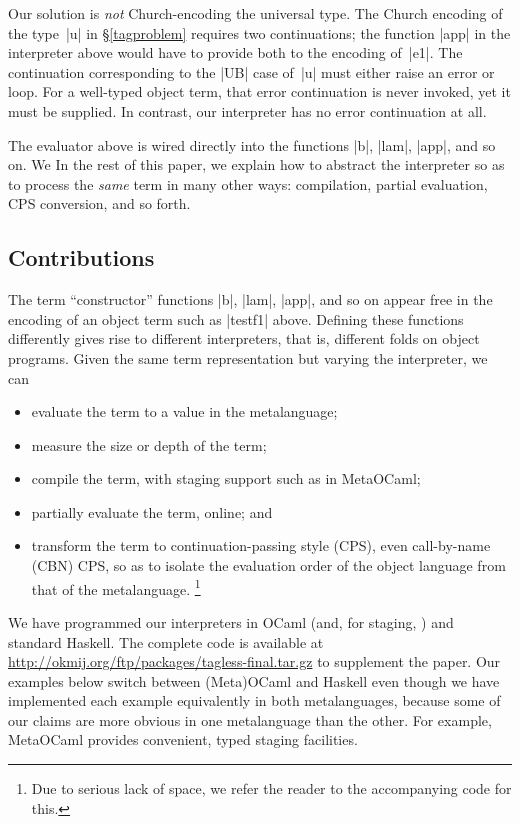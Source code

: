 Our solution is \emph{not} Church-encoding the
universal type. The Church encoding of the type~|u| in \S\ref{tagproblem}
requires two continuations; the function |app| in the interpreter above would
have to provide both to the encoding of~|e1|. The continuation
corresponding to the |UB| case of~|u| must either raise an error or
loop. For a well-typed object term, that error continuation is never
invoked, yet it must be supplied. In contrast, our interpreter has no error
continuation at all.

The evaluator above is wired directly into the
functions |b|, |lam|, |app|, and so on.  \ifshort We \else In the rest of this paper, we \fi
explain how to abstract the interpreter so as
to process the \emph{same} term in many other
ways: compilation, partial evaluation, CPS
conversion, and so forth.

\subsection{Contributions}\label{contributions}

The term ``constructor'' functions |b|, |lam|, |app|, and so on appear
free in the encoding of an object term such as |testf1| above.  Defining
these functions differently gives rise to different interpreters, that
is, different folds on object programs.  Given the same term
representation but varying the interpreter, we can
\begin{itemize}
    \item evaluate the term to a value in the metalanguage;
    \item measure the size or depth of the term;
    \item compile the term, with staging support such as in MetaOCaml;
    \item partially evaluate the term, online; and
    \item transform the term to continuation\hyp passing style (CPS),
        even call-by-name (CBN) CPS, so as to isolate the evaluation
        order of the object language from that of the metalanguage.\ifshort
\footnote{Due to serious lack of space, 
we refer the reader to the accompanying code for this.}\fi
\end{itemize}
We have programmed our interpreters in OCaml (and, for staging,
\citet{metaocaml}) and standard Haskell. The complete code is
available at \url{http://okmij.org/ftp/packages/tagless-final.tar.gz}
to supplement the paper. Our examples below switch between (Meta)OCaml
and Haskell even though we have implemented each example equivalently in
both metalanguages, because some of our claims are more obvious in one
metalanguage than the other.  For example, MetaOCaml provides
convenient, typed staging facilities.

